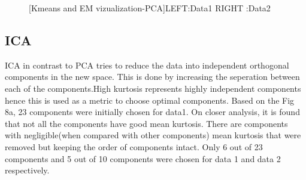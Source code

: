 \documentclass[12pt]{article}
\begin{document}
\begin{figure}[htbp]
    \centering
    \caption{[Kmeans and EM vizualization-PCA]LEFT:Data1 RIGHT
    :Data2}
    \label{fig:foobar}
\end{figure}

\subsection{ICA}
ICA in contrast to PCA tries to reduce the data into independent orthogonal components in the new space. This is done by increasing the seperation between each of the components.High kurtosis represents highly independent components hence this is used as a metric to choose optimal components. Based on the Fig 8a, 23 components were initially chosen for data1. On closer analysis, it is found that not all the components have good mean kurtosis. There are components with negligible(when compared with other components) mean kurtosis that were removed but keeping the order of components intact. Only 6 out of 23 components and 5 out of 10 components were chosen for data 1 and data 2 respectively.\
\end{document}
